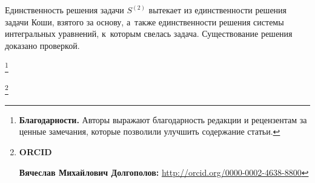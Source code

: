 Единственность решения задачи $S^{(2)}$ вытекает из единственности решения задачи Коши, взятого за основу, а~также единственности решения системы интегральных уравнений, к~которым свелась задача. Существование решения доказано проверкой.





\smallskip







\thanks{{\bf Благодарности.} Авторы выражают благодарность редакции и рецензентам за ценные замечания, которые позволили улучшить содержание статьи.}






\smallskip



\thanks{{\bf ORCID}



{\bf Вячеслав Михайлович Долгополов:} \url{http://orcid.org/0000-0002-4638-8800}



}



\RusRef



